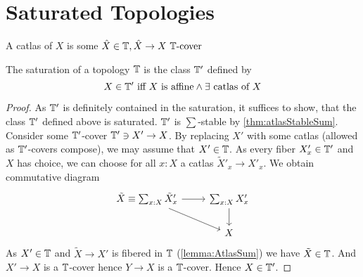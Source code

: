 

\section{Saturated Topologies}

\begin{definition}
	A catlas of $X$ is  some $\hat X \in \mathbb{T} , \hat X \to X \text{ $\mathbb{T}$-cover }$
\end{definition}
\begin{prop}
	The saturation of a topology $\mathbb{T}$ is the class $\mathbb{T}'$ defined by 
		\[
		X \in \mathbb{T}' \text{ iff $X$ is affine} \land \exists \text{ catlas of } X 
		\]


	
\end{prop}
\begin{proof}
	As $\mathbb{T}'$ is definitely contained in the saturation, it suffices to show, that the class $\mathbb{T}'$ defined above is saturated.
	$\mathbb{T}'$ is $\sum$-stable by \ref{thm:atlasStableSum}. \\
	Consider some $\mathbb{T}'$-cover $\mathbb{T}' \ni X' \to X$. By replacing $X'$ with some catlas (allowed as $\mathbb{T}'$-covers compose), we may assume that $X' \in \mathbb{T}$. As every fiber $X'_x \in \mathbb{T}'$ and $X$ has choice, we can choose for all $x : X$ a catlas $\tilde X'_x \to X'_x$. We obtain commutative diagram 
\[\begin{tikzcd}
	{\tilde X \equiv \sum_{x : X}\tilde X'_x} & {\sum_{x : X}X'_x} \\
	& X
	\arrow[from=1-1, to=1-2]
	\arrow[from=1-1, to=2-2]
	\arrow[from=1-2, to=2-2]
\end{tikzcd}\]
	As $X' \in \mathbb{T}$ and $\tilde X \to X'$ is fibered in $\mathbb{T}$ (\ref{lemma:AtlasSum}) we have $\tilde X \in \mathbb{T}$. And $X' \to X$ is a $\mathbb{T}$-cover hence $Y \to X$ is a $\mathbb{T}$-cover. Hence $X \in \mathbb{T}'$. %
	
\end{proof}
